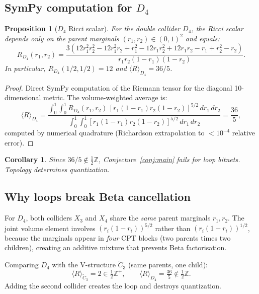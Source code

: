 \documentclass[11pt]{article}
\newtheorem{proposition}[theorem]{Proposition}
\newtheorem{corollary}[theorem]{Corollary}
\theoremstyle{definition}
\begin{document}
\subsection{SymPy computation for $D_4$}

\begin{proposition}[$D_4$ Ricci scalar]\label{prop:D4_R}
For the double collider $D_4$, the Ricci scalar depends only on the 
parent marginals $(r_1,r_2) \in (0,1)^2$ and equals:
\begin{equation}\label{eq:D4_R}
  R_{D_4}(r_1,r_2) = \frac{3(12r_1^2r_2^2 - 12r_1^2r_2 + r_1^2 
    - 12r_1r_2^2 + 12r_1r_2 - r_1 + r_2^2 - r_2)}
   {r_1 r_2 (1-r_1)(1-r_2)}.
\end{equation}
In particular, $R_{D_4}(1/2,1/2)=12$ and 
$\langle R\rangle_{D_4} = 36/5$.
\end{proposition}

\begin{proof}
Direct SymPy computation of the Riemann tensor for the diagonal 
10-dimensional metric.  The volume-weighted average is:
\[
  \langle R\rangle_{D_4} = 
  \frac{\displaystyle\int_0^1\!\int_0^1 R_{D_4}(r_1,r_2)\,
       [r_1(1-r_1)r_2(1-r_2)]^{5/2}\,dr_1\,dr_2}
  {\displaystyle\int_0^1\!\int_0^1 [r_1(1-r_1)r_2(1-r_2)]^{5/2}\,dr_1\,dr_2}
  = \frac{36}{5},
\]
computed by numerical quadrature (Richardson extrapolation to $< 10^{-4}$ 
relative error).
\end{proof}

\begin{corollary}
Since $36/5 \notin \tfrac{1}{2}\mathbb{Z}$, Conjecture~\ref{conj:main} 
fails for loop bitnets.  Topology determines quantization.
\end{corollary}

\subsection{Why loops break Beta cancellation}

For $D_4$, both colliders $X_3$ and $X_4$ share the \emph{same} parent 
marginals $r_1,r_2$.  The joint volume element involves $(r_i(1-r_i))^{5/2}$ 
rather than $(r_i(1-r_i))^{1/2}$, because the marginals appear in 
\emph{four} CPT blocks (two parents times two children), creating an 
additive mixture that prevents Beta factorisation.

Comparing $D_4$ with the V-structure $\tilde{C}_3$ (same parents, one child):
\[
  \langle R\rangle_{\tilde{C}_3} = 2 \in \tfrac{1}{2}\mathbb{Z}^+, 
  \qquad 
  \langle R\rangle_{D_4} = \tfrac{36}{5} \notin \tfrac{1}{2}\mathbb{Z}.
\]
Adding the second collider creates the loop and destroys quantization.
\end{document}
